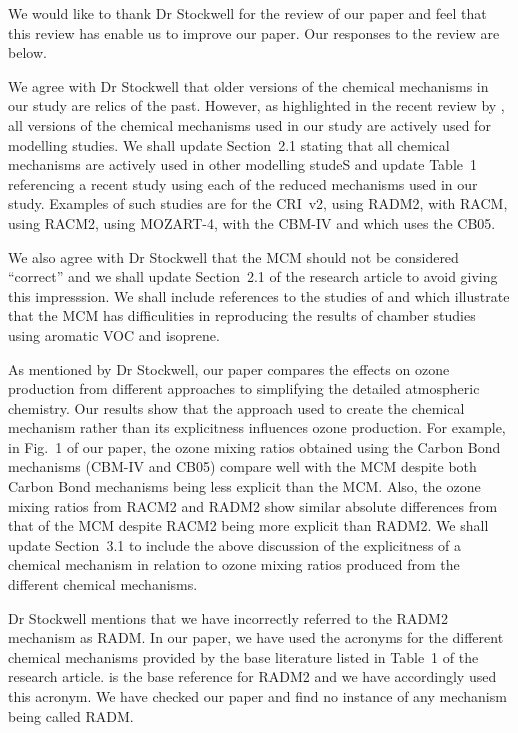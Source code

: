 \documentclass{article}
\begin{document}
We would like to thank Dr Stockwell for the review of our paper and feel that this review has enable us to improve our paper.
Our responses to the review are below.

We agree with Dr Stockwell that older versions of the chemical mechanisms in our study are relics of the past.
However, as highlighted in the recent review by \citet{Baklanov:2014}, all versions of the chemical mechanisms used in our study are actively used for modelling studies.
We shall update Section~2.1 stating that all chemical mechanisms are actively used in other modelling studeS and update Table~1 referencing a recent study using each of the reduced mechanisms used in our study.
Examples of such studies are \citet{Derwent:2015} for the CRI~v2, \citet{Li:2014a} using RADM2, \citet{Ahmadov:2015} with RACM, \citet{Goliff:2015} using RACM2, \citet{Hou:2015} using MOZART-4, \citet{Foster:2014} with the CBM-IV and \citet{Dunker:2015} which uses the CB05.

We also agree with Dr Stockwell that the MCM should not be considered ``correct'' and we shall update Section~2.1 of the research article to avoid giving this impresssion.
We shall include references to the studies of \citet{Bloss:2005} and \citet{Pinho:2005} which illustrate that the MCM has difficulities in reproducing the results of chamber studies using aromatic VOC and isoprene.

As mentioned by Dr Stockwell, our paper compares the effects on ozone production from different approaches to simplifying the detailed atmospheric chemistry.
Our results show that the approach used to create the chemical mechanism rather than its explicitness influences ozone production.
For example, in Fig.~1 of our paper, the ozone mixing ratios obtained using the Carbon Bond mechanisms (CBM-IV and CB05) compare well with the MCM despite both Carbon Bond mechanisms being less explicit than the MCM.
Also, the ozone mixing ratios from RACM2 and RADM2 show similar absolute differences from that of the MCM despite RACM2 being more explicit than RADM2.
We shall update Section~3.1 to include the above discussion of the explicitness of a chemical mechanism in relation to ozone mixing ratios produced from the different chemical mechanisms.

Dr Stockwell mentions that we have incorrectly referred to the RADM2 mechanism as RADM.
In our paper, we have used the acronyms for the different chemical mechanisms provided by the base literature listed in Table~1 of the research article.
\citet{Stockwell:1990} is the base reference for RADM2 and we have accordingly used this acronym.
We have checked our paper and find no instance of any mechanism being called RADM.



\end{document}
